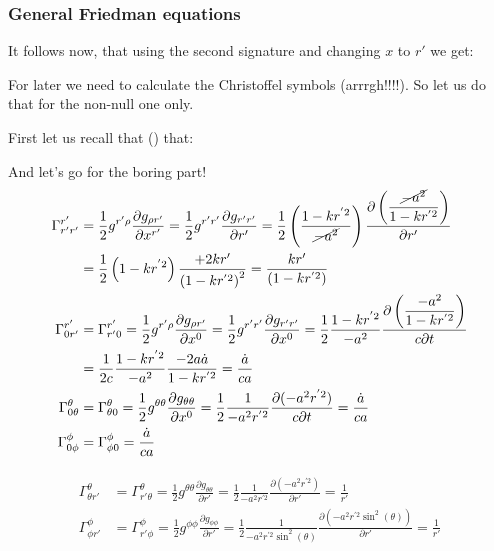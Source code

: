 	\subsubsection{General Friedman equations}
	It follows now, that using the second signature and changing $x$ to $r'$ we get:
	
	For later we need to calculate the Christoffel symbols (arrrgh!!!!). So let us do that for the non-null one only.

	First let us recall that () that:
	
	And let's go for the boring part!
	\begin{gather*}
		\begin{aligned}
		\Gamma^{r'}_{r'r'}&=\frac{1}{2} g^{r'\rho}\frac{\partial g_{\rho r'}}{\partial x^{r'}}=\frac{1}{2} g^{r'r'}\frac{\partial g_{r'r'}}{\partial r^\prime}=\frac{1}{2}\left(\frac{1-k r^{'2}}{\cancel{-a^2}}\right)\frac{\partial\left(\displaystyle\frac{\cancel{-a^2}}{1-k r^{'2}}\right)}{\partial r^\prime}\\
		&=\frac{1}{2}\left(1-k r^{'2}\right)\frac{+2k r'}{\left(1-k r^{'2}\right)^2}=\frac{k r'}{\left(1-k r^{'2}\right)}\\
		\Gamma^{r'}_{0r'}&=\Gamma^{r'}_{r'0}=\frac{1}{2} g^{r'\rho}\frac{\partial g_{\rho r'}}{\partial x^{0}}=\frac{1}{2} g^{r'r'}\frac{\partial g_{r'r'}}{\partial x^0}=\frac{1}{2}\frac{1-k r^{'2}}{-a^2}\frac{\partial\left(\displaystyle\frac{-a^2}{1-k r^{'2}}\right)}{c\partial t}\\
		&=\frac{1}{2c}\frac{1-k r^{'2}}{-a^2}\frac{-2 a \dot{a}}{1-k r^{'2}}=\frac{\dot{a}}{c a}\\
		\Gamma^{\theta}_{0\theta}&=\Gamma^{\theta}_{\theta 0}=\frac{1}{2} g^{\theta\theta}\frac{\partial g_{\theta\theta}}{\partial x^{0}}=\frac{1}{2}\frac{1}{-a^2 r^{'2}}\frac{\partial(-a^2 r^{'2})}{c\partial t}=\frac{\dot{a}}{c a}\\
		\Gamma^\phi_{0\phi}&=\Gamma^\phi_{\phi 0}=\frac{\dot{a}}{c a}
		\end{aligned}
	\end{gather*}
	
	\begin{gather*}
		\begin{aligned}
		\Gamma^{\theta}_{\theta r'}&=\Gamma^{\theta}_{r'\theta }=\frac{1}{2} g^{\theta\theta}\frac{\partial g_{\theta\theta}}{\partial r'}=\frac{1}{2}\frac{1}{-a^2 r^{'2}}\frac{\partial(-a^2 r^{'2})}{\partial r'}=\frac{1}{r'}\\
		\Gamma^{\phi}_{\phi r'}&=\Gamma^{\phi}_{r'\phi }=\frac{1}{2} g^{\phi\phi}\frac{\partial g_{\phi\phi}}{\partial r'}=\frac{1}{2}\frac{1}{-a^2 r^{'2}\sin^2(\theta)}\frac{\partial(-a^2 r^{'2}\sin^2(\theta))}{\partial r'}=\frac{1}{r'}
		\end{aligned}
	\end{gather*}
	
